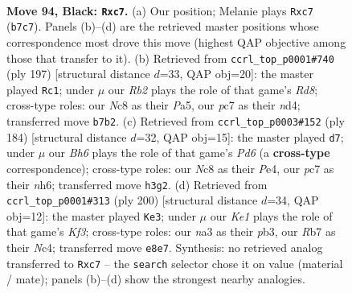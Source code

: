 \documentclass[11pt]{article}
\begin{document}
\clearpage

\begin{figure}[p]\centering
\begin{subfigure}{0.46\textwidth}\centering
\resizebox{\linewidth}{!}{%
\newchessgame
\chessboard[
  setfen={2n1k1K1/1rP5/p7/P4p1p/8/N3B1Pb/8/R7 b - - 0 94},
  showmover=false,
  pgfstyle=straightmove, color=movearrow, markmove={b7-c7}
]}
\caption{}
\end{subfigure}\hfill
\begin{subfigure}{0.46\textwidth}\centering
\resizebox{\linewidth}{!}{%
\newchessgame
\chessboard[
  setfen={6k1/5p2/5P2/p5P1/Pb1NK2R/8/8/3r4 b - - 19 99},
  showmover=false,
  pgfstyle=straightmove, color=movearrow, markmove={d1-c1}
]}
\caption{}
\end{subfigure}
\\[4pt]
\begin{subfigure}{0.46\textwidth}\centering
\resizebox{\linewidth}{!}{%
\newchessgame
\chessboard[
  setfen={2r5/6k1/1p1P3n/p3p3/P3P2R/6P1/4B3/7K w - - 0 93},
  showmover=false,
  pgfstyle=straightmove, color=movearrow, markmove={d6-d7}
]}
\caption{}
\end{subfigure}\hfill
\begin{subfigure}{0.46\textwidth}\centering
\resizebox{\linewidth}{!}{%
\newchessgame
\chessboard[
  setfen={5B2/3k4/p4p2/P1p1pP2/2N5/1pn2K2/8/8 w - - 2 101},
  showmover=false,
  pgfstyle=straightmove, color=movearrow, markmove={f3-e3}
]}
\caption{}
\end{subfigure}
\caption{\textbf{Move 94, Black: \texttt{Rxc7}.} (a) Our position; Melanie plays \texttt{Rxc7} (\texttt{b7c7}). Panels (b)--(d) are the retrieved master positions whose correspondence most drove this move (highest QAP objective among those that transfer to it). (b) Retrieved from \texttt{ccrl\_top\_p0001\#740} (ply 197) [structural distance $d$=33, QAP obj=20]: the master played \texttt{Rc1}; under $\mu$ our \emph{Rb2} plays the role of that game's \emph{Rd8}; cross-type roles: our \emph{N}c8 as their \emph{P}a5, our \emph{p}c7 as their \emph{n}d4; transferred move \texttt{b7b2}. (c) Retrieved from \texttt{ccrl\_top\_p0003\#152} (ply 184) [structural distance $d$=32, QAP obj=15]: the master played \texttt{d7}; under $\mu$ our \emph{Bh6} plays the role of that game's \emph{Pd6} (a \textbf{cross-type} correspondence); cross-type roles: our \emph{N}c8 as their \emph{P}e4, our \emph{p}c7 as their \emph{n}h6; transferred move \texttt{h3g2}. (d) Retrieved from \texttt{ccrl\_top\_p0001\#313} (ply 200) [structural distance $d$=34, QAP obj=12]: the master played \texttt{Ke3}; under $\mu$ our \emph{Ke1} plays the role of that game's \emph{Kf3}; cross-type roles: our \emph{n}a3 as their \emph{p}b3, our \emph{R}b7 as their \emph{N}c4; transferred move \texttt{e8e7}. Synthesis: no retrieved analog transferred to \texttt{Rxc7} -- the \texttt{search} selector chose it on value (material / mate); panels (b)--(d) show the strongest nearby analogies.}
\label{fig:thought-m187}
\end{figure}
\end{document}
